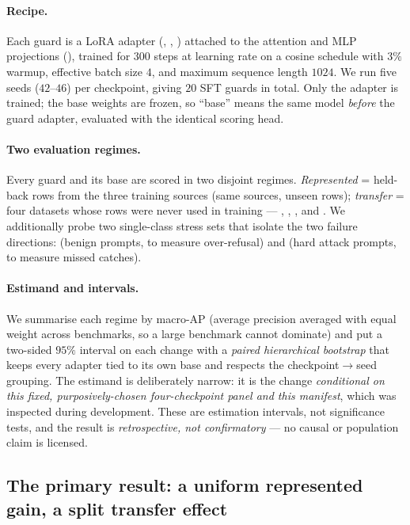 \paragraph{Recipe.} Each guard is a LoRA adapter (, , )
attached to the attention and MLP projections (), trained for $300$ steps at
learning rate  on a cosine schedule with $3\%$ warmup, effective batch size $4$, and maximum
sequence length $1024$. We run five seeds ($42$--$46$) per checkpoint, giving $20$ SFT guards in total.
Only the adapter is trained; the base weights are frozen, so ``base'' means the same model \emph{before}
the guard adapter, evaluated with the identical scoring head.

\paragraph{Two evaluation regimes.} Every guard and its base are scored in two disjoint regimes.
\emph{Represented} = held-back rows from the three training sources (same sources, unseen rows);
\emph{transfer} = four datasets whose rows were never used in training --- ,
, , and . We additionally probe two single-class
stress sets that isolate the two failure directions:  (benign prompts, to measure
over-refusal) and  (hard attack prompts, to measure missed catches).

\paragraph{Estimand and intervals.} We summarise each regime by macro-AP (average precision averaged
with equal weight across benchmarks, so a large benchmark cannot dominate) and put a two-sided $95\%$
interval on each change with a \emph{paired hierarchical bootstrap} that keeps every adapter tied to its
own base and respects the checkpoint$\to$seed grouping. The estimand is deliberately narrow: it is the
change \emph{conditional on this fixed, purposively-chosen four-checkpoint panel and this manifest},
which was inspected during development. These are estimation intervals, not significance tests, and the
result is \emph{retrospective, not confirmatory} --- no causal or population claim is licensed.

\subsection{The primary result: a uniform represented gain, a split transfer effect}
\label{sec:actI-primary}

